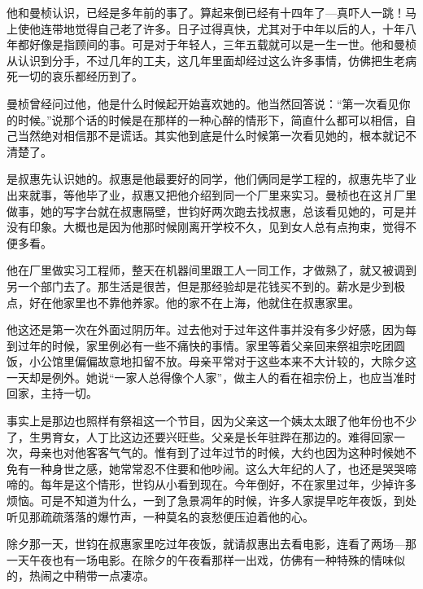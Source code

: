 \par 他和曼桢认识，已经是多年前的事了。算起来倒已经有十四年了—真吓人一跳！马上使他连带地觉得自己老了许多。日子过得真快，尤其对于中年以后的人，十年八年都好像是指顾间的事。可是对于年轻人，三年五载就可以是一生一世。他和曼桢从认识到分手，不过几年的工夫，这几年里面却经过这么许多事情，仿佛把生老病死一切的哀乐都经历到了。
\par 曼桢曾经问过他，他是什么时候起开始喜欢她的。他当然回答说：“第一次看见你的时候。”说那个话的时候是在那样的一种心醉的情形下，简直什么都可以相信，自己当然绝对相信那不是谎话。其实他到底是什么时候第一次看见她的，根本就记不清楚了。
\par 是叔惠先认识她的。叔惠是他最要好的同学，他们俩同是学工程的，叔惠先毕了业出来就事，等他毕了业，叔惠又把他介绍到同一个厂里来实习。曼桢也在这爿厂里做事，她的写字台就在叔惠隔壁，世钧好两次跑去找叔惠，总该看见她的，可是并没有印象。大概也是因为他那时候刚离开学校不久，见到女人总有点拘束，觉得不便多看。
\par 他在厂里做实习工程师，整天在机器间里跟工人一同工作，才做熟了，就又被调到另一个部门去了。那生活是很苦，但是那经验却是花钱买不到的。薪水是少到极点，好在他家里也不靠他养家。他的家不在上海，他就住在叔惠家里。
\par 他这还是第一次在外面过阴历年。过去他对于过年这件事并没有多少好感，因为每到过年的时候，家里例必有一些不痛快的事情。家里等着父亲回来祭祖宗吃团圆饭，小公馆里偏偏故意地扣留不放。母亲平常对于这些本来不大计较的，大除夕这一天却是例外。她说“一家人总得像个人家”，做主人的看在祖宗份上，也应当准时回家，主持一切。
\par 事实上是那边也照样有祭祖这一个节目，因为父亲这一个姨太太跟了他年份也不少了，生男育女，人丁比这边还要兴旺些。父亲是长年驻跸在那边的。难得回家一次，母亲也对他客客气气的。惟有到了过年过节的时候，大约也因为这种时候她不免有一种身世之感，她常常忍不住要和他吵闹。这么大年纪的人了，也还是哭哭啼啼的。每年是这个情形，世钧从小看到现在。今年倒好，不在家里过年，少掉许多烦恼。可是不知道为什么，一到了急景凋年的时候，许多人家提早吃年夜饭，到处听见那疏疏落落的爆竹声，一种莫名的哀愁便压迫着他的心。
\par 除夕那一天，世钧在叔惠家里吃过年夜饭，就请叔惠出去看电影，连看了两场—那一天午夜也有一场电影。在除夕的午夜看那样一出戏，仿佛有一种特殊的情味似的，热闹之中稍带一点凄凉。
